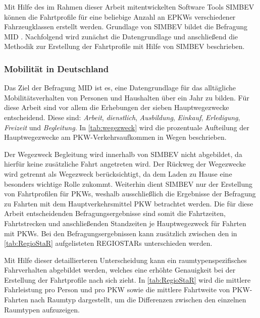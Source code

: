 Mit Hilfe des im Rahmen dieser Arbeit mitentwickelten Software Tools \gls{SIMBEV} können die Fahrtprofile für eine beliebige Anzahl an \glspl{EPKW} verschiedener Fahrzeugklassen erstellt werden.
Grundlage von \gls{SIMBEV} bildet die Befragung \gls{MID} \cite{ISGH2017}.
Nachfolgend wird zunächst die Datengrundlage und anschließend die Methodik zur Erstellung der Fahrtprofile mit Hilfe von \gls{SIMBEV} beschrieben.


\subsubsection{Mobilität in Deutschland}\label{chap:MID}

Das Ziel der Befragung \gls{MID} \cite{ISGH2017} ist es, eine Datengrundlage für das alltägliche Mobilitätsverhalten von Personen und Haushalten über ein Jahr zu bilden.
Für diese Arbeit sind vor allem die Erhebungen der sieben Hauptwegezwecke entscheidend.
Diese sind: \textit{Arbeit}, \textit{dienstlich}, \textit{Ausbildung}, \textit{Einkauf}, \textit{Erledigung}, \textit{Freizeit} und \textit{Begleitung}.
In \autoref{tab:wegezweck} wird die prozentuale Aufteilung der Hauptwegezwecke am \gls{PKW}-Verkehrsaufkommen in Wegen beschrieben.



Der Wegezweck \glqq Begleitung\grqq{} wird innerhalb von \gls{SIMBEV} nicht abgebildet, da hierfür keine zusätzliche Fahrt angetreten wird.
Der Rückweg der Wegezwecke wird getrennt als Wegezweck \nH berücksichtigt, da dem Laden zu Hause eine besonders wichtige Rolle zukommt.
Weiterhin dient \gls{SIMBEV} nur der Erstellung von Fahrtprofilen für \glspl{PKW}, weshalb ausschließlich die Ergebnisse der Befragung zu Fahrten mit dem Hauptverkehrsmittel \gls{PKW} betrachtet werden.
Die für diese Arbeit entscheidenden Befragungsergebnisse sind somit die Fahrtzeiten, Fahrtstrecken und anschließenden Standzeiten je Hauptwegezweck für Fahrten mit \glspl{PKW}.
Bei den Befragungsergebnissen kann zusätzlich zwischen den in \autoref{tab:RegioStaR} aufgelisteten \glspl{REGIOSTAR} unterschieden werden.



Mit Hilfe dieser detaillierteren Unterscheidung kann ein raumtypenspezifisches Fahrverhalten abgebildet werden, welches eine erhöhte Genauigkeit bei der Erstellung der Fahrtprofile nach sich zieht.
In \autoref{tab:RegioStaR} wird die mittlere Fahrleistung pro Person und pro \gls{PKW} sowie die mittlere Fahrtweite von \gls{PKW}-Fahrten nach Raumtyp dargestellt, um die Differenzen zwischen den einzelnen Raumtypen aufzuzeigen.

